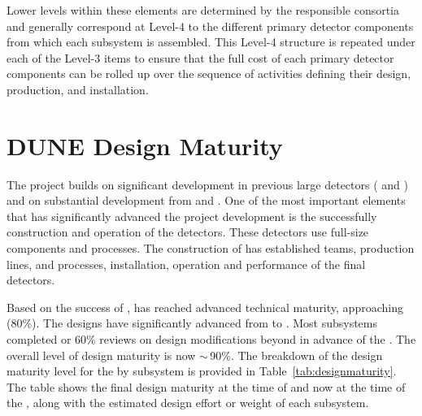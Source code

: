 Lower levels within these  elements are determined by 
the responsible consortia and generally correspond at Level-4 to 
the different primary detector components from which each subsystem
is assembled.  This Level-4 structure is repeated under each of the 
Level-3 items to ensure that the full cost of each primary detector 
components can be rolled up over the sequence of activities defining 
their design, production, and installation.       

\section{DUNE Design Maturity}

The  project builds on significant development in previous
large  detectors ( and ) and on
substantial development from  and . One of the most important
elements that has significantly advanced the project development is
the successfully construction and operation of the 
detectors. These detectors use full-size  components and
processes. The construction of  has established
teams, production lines,  and  processes, installation, operation
and performance of the final  detectors. 

Based on the
success of ,  has reached advanced technical
maturity, approaching (80\%). The designs have significantly advanced
from  to . Most subsystems completed
 or 60\% reviews on design modifications beyond
 in advance of the . The overall level of
design maturity is now $\sim\,$90\%. The breakdown of the design maturity
level for the  by subsystem is provided in
Table~\ref{tab:designmaturity}. The table shows the final 
design maturity at the time of  and now at the time
of the , along with the estimated design effort or weight
of each subsystem. 

